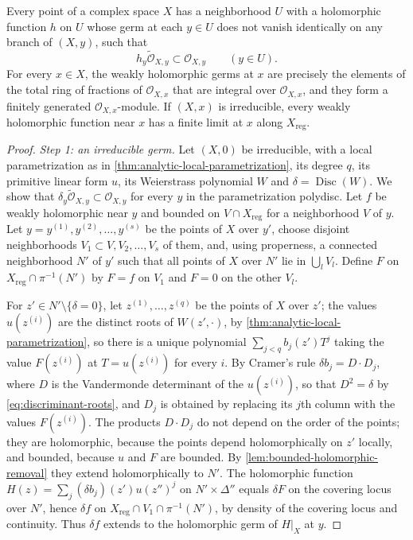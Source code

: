 \begin{proposition}\label{prop:weak-holomorphic-denominator}
Every point of a complex space $X$ has a neighborhood $U$ with a holomorphic function $h$ on $U$ whose germ at each $y\in U$ does not vanish identically on any branch of $(X,y)$, such that
\[
 h_y\widetilde{\mathcal O}_{X,y}\subset\mathcal O_{X,y}
 \qquad(y\in U).
\]
For every $x\in X$, the weakly holomorphic germs at $x$ are precisely the elements of the total ring of fractions of $\mathcal O_{X,x}$ that are integral over $\mathcal O_{X,x}$, and they form a finitely generated $\mathcal O_{X,x}$-module. If $(X,x)$ is irreducible, every weakly holomorphic function near $x$ has a finite limit at $x$ along $X_{\mathrm{reg}}$.
\end{proposition}
\begin{proof}
\emph{Step 1: an irreducible germ.} Let $(X,0)$ be irreducible, with a local parametrization as in \cref{thm:analytic-local-parametrization}, its degree $q$, its primitive linear form $u$, its Weierstrass polynomial $W$ and $\delta=\operatorname{Disc}(W)$. We show that $\delta_y\widetilde{\mathcal O}_{X,y}\subset\mathcal O_{X,y}$ for every $y$ in the parametrization polydisc. Let $f$ be weakly holomorphic near $y$ and bounded on $V\cap X_{\mathrm{reg}}$ for a neighborhood $V$ of $y$. Let $y=y^{(1)},y^{(2)},\ldots,y^{(s)}$ be the points of $X$ over $y'$, choose disjoint neighborhoods $V_1\subset V,V_2,\ldots,V_s$ of them, and, using properness, a connected neighborhood $N'$ of $y'$ such that all points of $X$ over $N'$ lie in $\bigcup_lV_l$. Define $F$ on $X_{\mathrm{reg}}\cap\pi^{-1}(N')$ by $F=f$ on $V_1$ and $F=0$ on the other $V_l$.

For $z'\in N'\setminus\{\delta=0\}$, let $z^{(1)},\ldots,z^{(q)}$ be the points of $X$ over $z'$; the values $u(z^{(i)})$ are the distinct roots of $W(z',\cdot)$, by \cref{thm:analytic-local-parametrization}, so there is a unique polynomial $\sum_{j<q}b_j(z')T^j$ taking the value $F(z^{(i)})$ at $T=u(z^{(i)})$ for every $i$. By Cramer's rule $\delta b_j=D\cdot D_j$, where $D$ is the Vandermonde determinant of the $u(z^{(i)})$, so that $D^2=\delta$ by \eqref{eq:discriminant-roots}, and $D_j$ is obtained by replacing its $j$th column with the values $F(z^{(i)})$. The products $D\cdot D_j$ do not depend on the order of the points; they are holomorphic, because the points depend holomorphically on $z'$ locally, and bounded, because $u$ and $F$ are bounded. By \cref{lem:bounded-holomorphic-removal} they extend holomorphically to $N'$. The holomorphic function $H(z)=\sum_j(\delta b_j)(z')u(z'')^j$ on $N'\times\Delta''$ equals $\delta F$ on the covering locus over $N'$, hence $\delta f$ on $X_{\mathrm{reg}}\cap V_1\cap\pi^{-1}(N')$, by density of the covering locus and continuity. Thus $\delta f$ extends to the holomorphic germ of $H|_X$ at $y$.


\end{proof}
